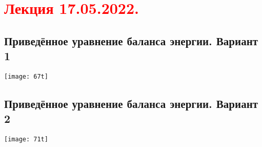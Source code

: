 \documentclass[main.tex]{subfiles}
\begin{document}
\section{\textcolor{red}{Лекция 17.05.2022.}}

\subsection{Приведённое уравнение баланса энергии. Вариант 1}
\texttt{[image: 67t]}




\subsection{Приведённое уравнение баланса энергии. Вариант 2}
\texttt{[image: 71t]}


\end{document}
